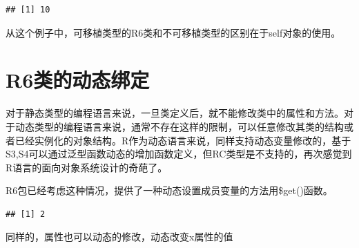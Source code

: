 \documentclass[]{book}
\newenvironment{Shaded}{\begin{snugshade}}{\end{snugshade}}
\newcommand{\KeywordTok}[1]{\textcolor[rgb]{0.13,0.29,0.53}{\textbf{#1}}}
\newcommand{\DataTypeTok}[1]{\textcolor[rgb]{0.13,0.29,0.53}{#1}}
\newcommand{\DecValTok}[1]{\textcolor[rgb]{0.00,0.00,0.81}{#1}}
\newcommand{\StringTok}[1]{\textcolor[rgb]{0.31,0.60,0.02}{#1}}
\newcommand{\CommentTok}[1]{\textcolor[rgb]{0.56,0.35,0.01}{\textit{#1}}}
\newcommand{\OtherTok}[1]{\textcolor[rgb]{0.56,0.35,0.01}{#1}}
\newcommand{\ControlFlowTok}[1]{\textcolor[rgb]{0.13,0.29,0.53}{\textbf{#1}}}
\newcommand{\OperatorTok}[1]{\textcolor[rgb]{0.81,0.36,0.00}{\textbf{#1}}}
\newcommand{\NormalTok}[1]{#1}
\begin{document}
\begin{verbatim}
## [1] 10
\end{verbatim}

从这个例子中，可移植类型的R6类和不可移植类型的区别在于self对象的使用。

\section{R6类的动态绑定}\label{r6}

对于静态类型的编程语言来说，一旦类定义后，就不能修改类中的属性和方法。对于动态类型的编程语言来说，通常不存在这样的限制，可以任意修改其类的结构或者已经实例化的对象结构。R作为动态语言来说，同样支持动态变量修改的，基于S3,S4可以通过泛型函数动态的增加函数定义，但RC类型是不支持的，再次感觉到R语言的面向对象系统设计的奇葩了。

R6包已经考虑这种情况，提供了一种动态设置成员变量的方法用\$get()函数。

\begin{Shaded}
\end{Shaded}

\begin{verbatim}
## [1] 2
\end{verbatim}

同样的，属性也可以动态的修改，动态改变x属性的值

\begin{Shaded}
\end{Shaded}
\end{document}
